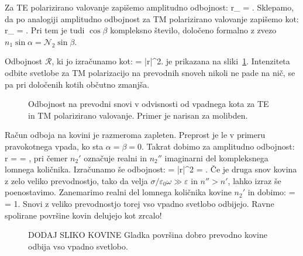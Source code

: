 Za TE polarizirano valovanje zapišemo amplitudno odbojnost:
\beq
r_ = .
\label{eq:04_99}
\eeq
Sklepamo, da po analogiji amplitudno odbojnost za TM polarizirano valovanje zapišemo kot: 
\beq
r_ = .
\label{eq:04_100}
\eeq
Pri tem je tudi $\cos \beta$ kompleksno število, določeno formalno 
z zvezo $n_1 \sin \alpha = \mathcal{N}_2 \sin \beta$.

Odbojnost $\mathcal{R}$, ki jo izračunamo kot:
\beq
{} = |r|^2.
\label{eq:04_100a}
\eeq
je prikazana na sliki~\ref{fig:04_kovina}. Intenziteta odbite svetlobe za TM polarizacijo 
na prevodnih snoveh nikoli ne pade na nič, se pa pri določenih kotih občutno
zmanjša. 
\begin{figure}[ht]
\centering
\def\svgwidth{60truemm} 

\caption{Odbojnost na prevodni snovi v odvisnosti od vpadnega kota za TE in TM polarizirano
valovanje. Primer je narisan za molibden.}
\label{fig:04_kovina}
\end{figure}

Račun odboja na kovini je razmeroma zapleten. Preprost je le v primeru pravokotnega vpada, 
ko sta $\alpha = \beta = 0$. Takrat dobimo za amplitudno odbojnost:
\beq
r =  = ,
\label{eq:04_101}
\eeq
pri čemer $n_2'$ označuje realni in $n_2''$ imaginarni del kompleksnega lomnega količnika.
Izračunamo še odbojnost:
\beq
{} = |r|^2 = .
\label{eq:04_102}
\eeq
Če je druga snov kovina z zelo veliko prevodnostjo, tako da velja $\sigma/\varepsilon_0 \omega \gg \varepsilon$
in $n''> n'$, lahko izraz še poenostavimo. Zanemarimo realni del lomnega količnika kovine $n_2'$
in dobimo:
\beq
{} =  = 1.
\label{eq:04_103}
\eeq
Snovi z veliko prevodnostjo torej vso vpadno svetlobo odbijejo. Ravne spolirane površine kovin
delujejo kot zrcalo!
\begin{figure}[ht]
\centering
\caption{DODAJ SLIKO KOVINE Gladka površina dobro prevodno kovine odbija vso vpadno svetlobo.}
\label{fig:04_KovinaFoto}
\end{figure}
